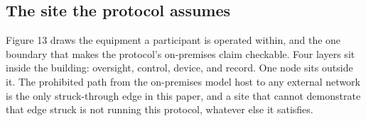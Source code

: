 \subsection{The site the protocol assumes}

Figure 13 draws the equipment a participant is operated within, and the one
boundary that makes the protocol's on-premises claim checkable. Four layers sit
inside the building: oversight, control, device, and record. One node sits
outside it. The prohibited path from the on-premises model host to any external
network is the only struck-through edge in this paper, and a site that cannot
demonstrate that edge struck is not running this protocol, whatever else it
satisfies.

